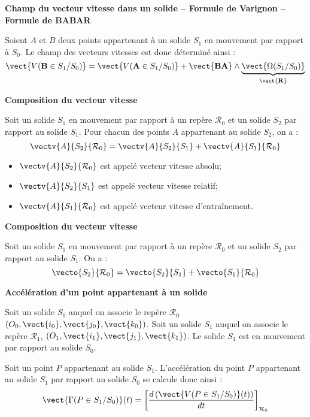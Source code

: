 \begin{resultat}
\textbf{Champ du vecteur vitesse dans un solide -- Formule de Varignon -- Formule de BABAR}

Soient $A$ et $B$ deux points appartenant à un solide $S_1$ en mouvement par rapport à $S_0$. Le champ des vecteurs vitesses est donc déterminé ainsi :
$$
\vect{V(\mathbf{B}\in S_1/S_0)} = \vect{V(\mathbf{A}\in S_1/S_0)} + \vect{\mathbf{BA}}\wedge \underbrace{\vect{\Omega(S_1/S_0)}}_{\mathbf{\vect{R}}}
$$

\end{resultat}


\begin{resultat}
\textbf{Composition du vecteur vitesse}
\label{ref_va}

Soit un solide $S_1$ en mouvement par rapport à un repère $\mathcal{R}_0$ et un solide $S_2$ par rapport au solide $S_1$. Pour chacun des points $A$ appartenant au solide $S_2$, on a :
$$
\vectv{A}{S_2}{\mathcal{R}_0}=
\vectv{A}{S_2}{S_1}+\vectv{A}{S_1}{\mathcal{R}_0}
$$
\end{resultat}


\begin{rem}
\begin{itemize}
\item $\vectv{A}{S_2}{\mathcal{R}_0}$ est appelé vecteur vitesse absolu;
\item $\vectv{A}{S_2}{S_1}$ est appelé vecteur vitesse relatif; 
\item $\vectv{A}{S_1}{\mathcal{R}_0}$ est appelé vecteur vitesse d'entraînement.
\end{itemize}
\end{rem}

\begin{resultat}
\textbf{Composition du vecteur vitesse}

Soit un solide $S_1$ en mouvement par rapport à un repère $\mathcal{R}_0$ et un solide $S_2$ par rapport au solide $S_1$. On a : 
$$
\vecto{S_2}{\mathcal{R}_0}=
\vecto{S_2}{S_1}+\vecto{S_1}{\mathcal{R}_0}
$$
\end{resultat}

\begin{defi}
\textbf{Accélération d'un point appartenant à un solide}

Soit un solide $S_0$ auquel on associe le repère $\mathcal{R}_0$ $\left(O_0,\vect{i_0},\vect{j_0},\vect{k_0} \right)$.  Soit un solide $S_1$ auquel on associe le repère $\mathcal{R}_1$,  $\left(O_1,\vect{i_1},\vect{j_1},\vect{k_1} \right)$. Le solide $S_1$ est en mouvement par rapport au solide $S_0$. 


Soit un point $P$ appartenant au solide $S_1$. L'accélération du point $P$ appartenant au solide $S_1$ par rapport au solide $S_0$ se calcule donc ainsi : 
$$
\vect{\Gamma(P\in S_1/S_0)}(t) = \left[\dfrac{d\left( \vect{V(P\in S_1/S_0)}(t)\right)}{dt}\right]_{\mathcal{R}_0}
$$

\end{defi}

